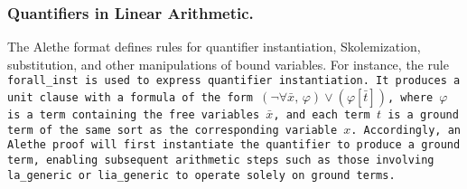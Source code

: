 \subsubsection{Quantifiers in Linear Arithmetic.}

The Alethe format defines rules for quantifier instantiation, Skolemization, substitution, and other manipulations of bound variables.
For instance, the rule \tt{forall\_inst} is used to express quantifier instantiation. It produces a unit clause with a formula of the form $(\neg \forall \bar{x},\, \varphi) \lor (\varphi[\bar{t}])$,
where $\varphi$ is a term containing the free variables $\bar{x}$, and each term $t$ is a ground term of the same sort as the corresponding variable $x$.
Accordingly, an Alethe proof will first instantiate the quantifier to produce a ground term, enabling subsequent arithmetic steps such as those involving \tt{la\_generic} or \tt{lia\_generic} to operate solely on ground terms.

